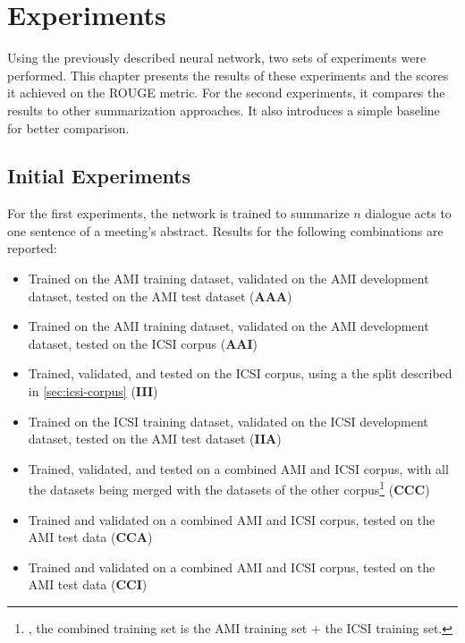 \chapter{Experiments}\label{ch:experiments}

Using the previously described neural network, two sets of experiments were performed.
This chapter presents the results of these experiments and the scores it achieved on the ROUGE metric.
For the second experiments, it compares the results to other summarization approaches.
It also introduces a simple baseline for better comparison.


\section{Initial Experiments}\label{sec:initial-experiments}

For the first experiments, the network is trained to summarize $n$ dialogue acts to one sentence of a meeting's abstract.
Results for the following combinations are reported:

\begin{itemize}
\item Trained on the AMI training dataset, validated on the AMI development dataset, tested on the AMI test dataset (\textbf{AAA})
\item Trained on the AMI training dataset, validated on the AMI development dataset, tested on the ICSI corpus (\textbf{AAI})
\item Trained, validated, and tested on the ICSI corpus, using a the split described in \cref{sec:icsi-corpus} (\textbf{III})
\item Trained on the ICSI training dataset, validated on the ICSI development dataset, tested on the AMI test dataset (\textbf{IIA})
\item Trained, validated, and tested on a combined AMI and ICSI corpus, with all the datasets being merged with the datasets of the other corpus\footnote{\Eg, the combined training set is the AMI training set + the ICSI training set.} (\textbf{CCC})
\item Trained and validated on a combined AMI and ICSI corpus, tested on the AMI test data (\textbf{CCA})
\item Trained and validated on a combined AMI and ICSI corpus, tested on the AMI test data (\textbf{CCI})
\end{itemize}

